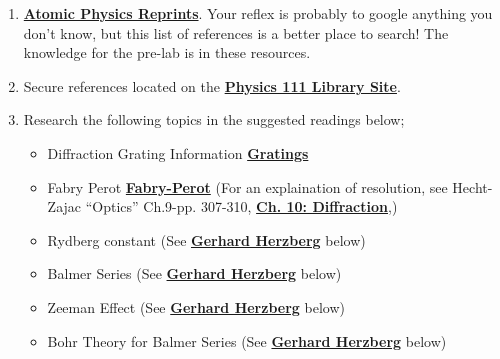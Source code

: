\documentclass{../lab}
\begin{document}
\begin{enumerate}
    \item \href{http://physics111.lib.berkeley.edu/Physics111/Reprints/ATM/ATM\_index.html}{\textbf{Atomic Physics Reprints}}. Your reflex is probably to google anything you don't know, but this list of references is a better place to search! The knowledge for the pre-lab is in these resources.

    \item Secure references located on the \href{http://physics111.lib.berkeley.edu/Physics111/Reprints/ATM/ATM\_index.html}{\textbf{Physics 111 Library Site}}.

    \item Research the following topics in the suggested readings below;
    
    \begin{itemize}
        \item Diffraction Grating Information \href{http://physics111.lib.berkeley.edu/Physics111/Reprints/ATM/grating.pdf}{\textbf{Gratings}}
    
        \item Fabry Perot \href{http://physics111.lib.berkeley.edu/Physics111/Reprints/ATM/OCR\%20Burleigh\%20tech\%20memo\%20fabry\%20perots.pdf}{\textbf{Fabry-Perot}} (For an explaination of resolution, see Hecht-Zajac ``Optics'' Ch.9-pp. 307-310, \href{http://physics111.lib.berkeley.edu/Physics111/Reprints/ATM/Optics\%20Hecht\%20&\%20Zajac/Ch.\%2010\%20diffraction.pdf}{\textbf{Ch. 10: Diffraction}},)
    
        \item Rydberg constant (See \href{http://physics111.lib.berkeley.edu/Physics111/Reprints/ATM/02-2ndEd-Atomic\_Spectra\_and\_Atomic\_Structure.pdf}{\textbf{Gerhard Herzberg}} below)
    
        \item Balmer Series (See \href{http://physics111.lib.berkeley.edu/Physics111/Reprints/ATM/02-2ndEd-Atomic\_Spectra\_and\_Atomic\_Structure.pdf}{\textbf{Gerhard Herzberg}} below)
    
        \item Zeeman Effect (See \href{http://physics111.lib.berkeley.edu/Physics111/Reprints/ATM/02-2ndEd-Atomic\_Spectra\_and\_Atomic\_Structure.pdf}{\textbf{Gerhard Herzberg}} below)
    
        \item Bohr Theory for Balmer Series (See \href{http://physics111.lib.berkeley.edu/Physics111/Reprints/ATM/02-2ndEd-Atomic\_Spectra\_and\_Atomic\_Structure.pdf}{\textbf{Gerhard Herzberg}} below)
    

\end{itemize}
\end{enumerate}
\end{document}
